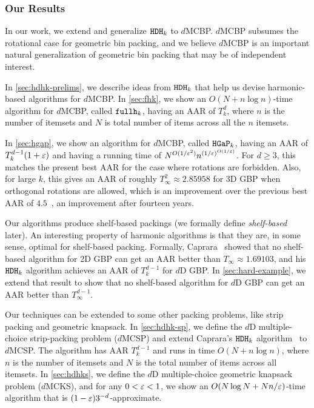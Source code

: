\subsubsection{Our Results}

In our work, we extend and generalize $\operatorname{\mathtt{HDH}}_{k}$ to $d$MCBP.
$d$MCBP subsumes the rotational case for geometric bin packing,
and we believe $d$MCBP is an important natural generalization
of geometric bin packing that may be of independent interest.

In \cref{sec:hdhk-prelims}, we describe ideas from $\operatorname{\mathtt{HDH}}_{k}$
that help us devise harmonic-based algorithms for $d$MCBP.
In \cref{sec:fhk}, we show an $O(N + n\log n)$-time algorithm for $d$MCBP,
called $\operatorname{\mathtt{fullh}}_k$, having an AAR of $T_k^d$, where $n$ is the number of itemsets
and $N$ is total number of items across all the $n$ itemsets.

In \cref{sec:hgap}, we show an algorithm for $d$MCBP, called $\operatorname{\mathtt{HGaP}}_k$, having an AAR of
$T_k^{d-1}(1+\varepsilon)$ and having a running time of $N^{O(1/\varepsilon^2)}n^{(1/\varepsilon)^{O(1/\varepsilon)}}$.
For $d \ge 3$, this matches the present best AAR for the case
where rotations are forbidden.
Also, for large $k$, this gives an AAR of roughly $T_{\infty}^2 \approx 2.85958$
for 3D GBP when orthogonal rotations are allowed,
which is an improvement over the previous best AAR of $4.5$~\cite{epstein2006side},
an improvement after fourteen years.

\begin{optional}
Our algorithms produce shelf-based packings (we formally define \emph{shelf-based} later).
An interesting property of harmonic algorithms is that they are,
in some sense, optimal for shelf-based packing. Formally,
Caprara~\cite{caprara2008} showed that no shelf-based algorithm for 2D GBP can get an AAR
better than $T_{\infty} \approx 1.69103$,
and his $\operatorname{\mathtt{HDH}}_{k}$ algorithm achieves an AAR of $T_k^{d-1}$ for $d$D GBP.
In \cref{sec:hard-example}, we extend that result to show that no shelf-based algorithm
for $d$D GBP can get an AAR better than $T_{\infty}^{d-1}$.%
\end{optional}

Our techniques can be extended to some other packing problems,
like strip packing and geometric knapsack.
In \cref{sec:hdhk-sp}, we define the $d$D multiple-choice strip-packing problem ($d$MCSP)
and extend Caprara's $\operatorname{\mathtt{HDH}}_{k}$ algorithm~\cite{caprara2008} to $d$MCSP.
The algorithm has AAR $T_k^{d-1}$ and runs in time $O(N + n\log n)$,
where $n$ is the number of itemsets and $N$ is the total number of items across all itemsets.
In \cref{sec:hdhks}, we define the $d$D multiple-choice geometric knapsack problem ($d$MCKS),
and for any $0 < \varepsilon < 1$, we show an $O(N\log N + Nn/\varepsilon)$-time algorithm
that is $(1-\varepsilon)3^{-d}$-approximate.

